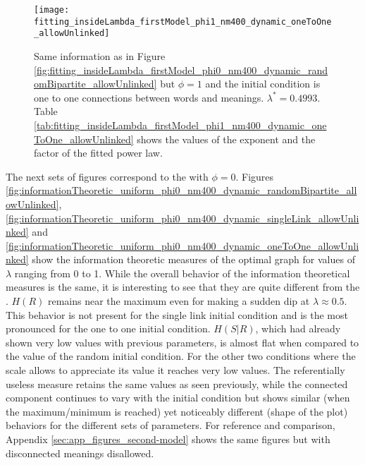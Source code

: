 \begin{figure}
  \centering
  \texttt{[image: fitting\_insideLambda\_firstModel\_phi1\_nm400\_dynamic\_oneToOne\_allowUnlinked]}
  \caption{Same information as in Figure \ref{fig:fitting_insideLambda_firstModel_phi0_nm400_dynamic_randomBipartite_allowUnlinked} but $\phi=1$ and the initial condition is one to one connections between words and meanings. $\lambda^*=0.4993$.
Table \ref{tab:fitting_insideLambda_firstModel_phi1_nm400_dynamic_oneToOne_allowUnlinked} shows the values of the exponent and the factor of the fitted power law.}
  \label{fig:fitting_insideLambda_firstModel_phi1_nm400_dynamic_oneToOne_allowUnlinked}
\end{figure}





The next sets of figures correspond to the \secondmodel{} with $\phi=0$.
Figures \ref{fig:informationTheoretic_uniform_phi0_nm400_dynamic_randomBipartite_allowUnlinked},  \ref{fig:informationTheoretic_uniform_phi0_nm400_dynamic_singleLink_allowUnlinked} and  \ref{fig:informationTheoretic_uniform_phi0_nm400_dynamic_oneToOne_allowUnlinked} show the information theoretic measures of the optimal graph for values of $\lambda$ ranging from 0 to 1.
While the overall behavior of the information theoretical measures is the same, it is interesting to see that they are quite different from the \firstmodel{}.
$H(R)$ remains near the maximum even for \lambdaHalfToOne{} making a sudden dip at $\lambda \approx 0.5$.
This behavior is not present for the single link initial condition and is the most pronounced for the one to one initial condition.
$H(S|R)$, which had already shown very low values with previous parameters, is almost flat when compared to the value of the random initial condition.
For the other two conditions where the scale allows to appreciate its value it reaches very low values.
The referentially useless measure retains the same values as seen previously, while the connected component continues to vary with the initial condition but shows similar (when the maximum/minimum is reached) yet noticeably different (shape of the plot) behaviors for the different sets of parameters.
For reference and comparison, Appendix \ref{sec:app_figures_second-model} shows the same figures but with disconnected meanings disallowed.

